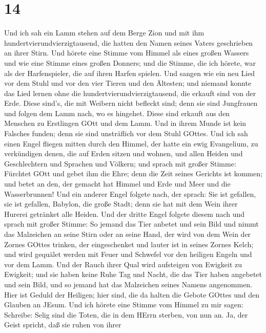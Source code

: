 \hypertarget{section-12}{%
\section{14}\label{section-12}}

 Und ich sah ein Lamm stehen auf dem Berge Zion und mit ihm
hundertvierundvierzigtausend, die hatten den Namen seines Vaters
geschrieben an ihrer Stirn.  Und hörete eine Stimme vom
Himmel als eines großen Wassers und wie eine Stimme eines großen
Donners; und die Stimme, die ich hörete, war als der Harfenspieler, die
auf ihren Harfen spielen.  Und sangen wie ein neu Lied vor
dem Stuhl und vor den vier Tieren und den Ältesten; und niemand konnte
das Lied lernen ohne die hundertvierundvierzigtausend, die erkauft sind
von der Erde.  Diese sind's, die mit Weibern nicht befleckt
sind; denn sie sind Jungfrauen und folgen dem Lamm nach, wo es hingehet.
Diese sind erkauft aus den Menschen zu Erstlingen GOtt und dem Lamm.
 Und in ihrem Munde ist kein Falsches funden; denn sie sind
unsträflich vor dem Stuhl GOttes.  Und ich sah einen Engel
fliegen mitten durch den Himmel, der hatte ein ewig Evangelium, zu
verkündigen denen, die auf Erden sitzen und wohnen, und allen Heiden und
Geschlechtern und Sprachen und Völkern;  und sprach mit
großer Stimme: Fürchtet GOtt und gebet ihm die Ehre; denn die Zeit
seines Gerichts ist kommen; und betet an den, der gemacht hat Himmel und
Erde und Meer und die Wasserbrunnen!  Und ein anderer Engel
folgete nach, der sprach: Sie ist gefallen, sie ist gefallen, Babylon,
die große Stadt; denn sie hat mit dem Wein ihrer Hurerei getränket alle
Heiden.  Und der dritte Engel folgete diesem nach und sprach
mit großer Stimme: So jemand das Tier anbetet und sein Bild und nimmt
das Malzeichen an seine Stirn oder an seine Hand,  der wird
von dem Wein der Zornes GOttes trinken, der eingeschenket und lauter ist
in seines Zornes Kelch; und wird gequälet werden mit Feuer und Schwefel
vor den heiligen Engeln und vor dem Lamm.  Und der Rauch
ihrer Qual wird aufsteigen von Ewigkeit zu Ewigkeit; und sie haben keine
Ruhe Tag und Nacht, die das Tier haben angebetet und sein Bild, und so
jemand hat das Malzeichen seines Namens angenommen.  Hier
ist Geduld der Heiligen; hier sind, die da halten die Gebote GOttes und
den Glauben an JEsum.  Und ich hörete eine Stimme vom
Himmel zu mir sagen: Schreibe: Selig sind die Toten, die in dem HErrn
sterben, von nun an. Ja, der Geist spricht, daß sie ruhen von ihrer
